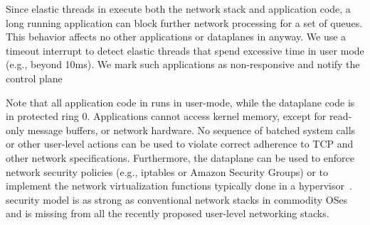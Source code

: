 Since elastic threads in \ix execute both the network stack and
application code, a long running application can block further network
processing for a set of queues. This behavior affects no other
applications or dataplanes in anyway. We use a timeout interrupt to
detect elastic threads that spend excessive time in user mode (e.g.,
beyond 10ms). We mark such applications as non-responsive and notify
the control plane

Note that all application code in \ix runs in user-mode, while the
dataplane code is in protected ring 0. Applications cannot access
kernel memory, except for read-only message buffers, or network
hardware.  No sequence of batched system calls or other user-level
actions can be used to violate correct adherence to TCP and other
network specifications.  Furthermore, the dataplane can be used to
enforce network security policies (e.g., iptables or Amazon Security
Groups) or to implement the network virtualization functions typically
done in a hypervisor~\cite{nsdi:nsx}.  security model is as strong
as conventional network stacks in commodity OSes and is missing from all
the recently proposed user-level networking stacks. 


